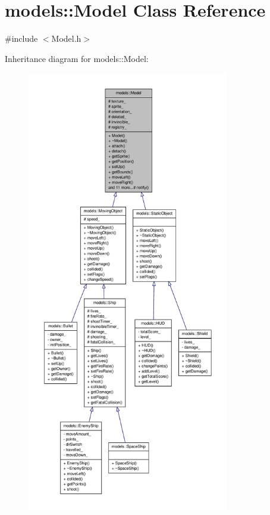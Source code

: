\hypertarget{classmodels_1_1Model}{\section{models\-:\-:\-Model \-Class \-Reference}
\label{dd/db5/classmodels_1_1Model}
}


{\ttfamily \#include $<$\-Model.\-h$>$}



\-Inheritance diagram for models\-:\-:\-Model\-:\nopagebreak
\begin{figure}[H]
\begin{center}
\leavevmode
\includegraphics[height=550pt]{dd/dc4/classmodels_1_1Model__inherit__graph}
\end{center}
\end{figure}
